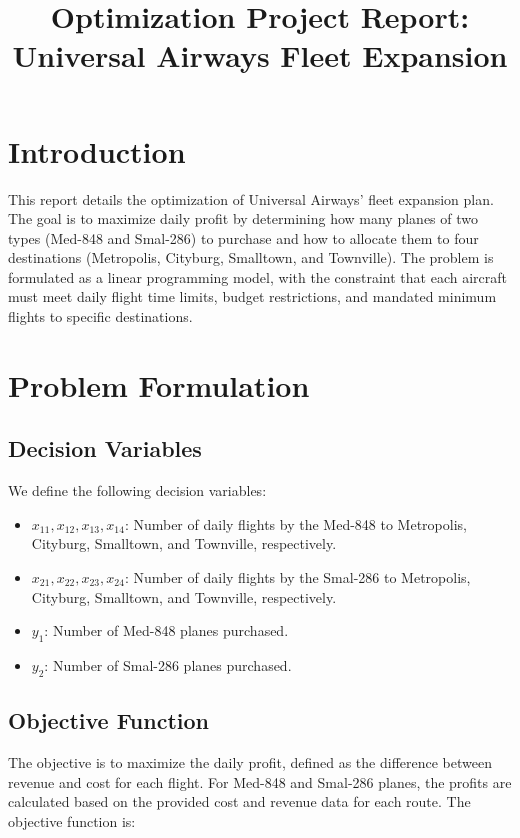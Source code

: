 \documentclass{article}
\title{Optimization Project Report: Universal Airways Fleet Expansion}
\author{}
\date{}
\begin{document}
\maketitle

\section*{Introduction}
This report details the optimization of Universal Airways' fleet expansion plan. The goal is to maximize daily profit by determining how many planes of two types (Med-848 and Smal-286) to purchase and how to allocate them to four destinations (Metropolis, Cityburg, Smalltown, and Townville). The problem is formulated as a linear programming model, with the constraint that each aircraft must meet daily flight time limits, budget restrictions, and mandated minimum flights to specific destinations.

\section*{Problem Formulation}

\subsection*{Decision Variables}
We define the following decision variables:
\begin{itemize}
    \item $x_{11}, x_{12}, x_{13}, x_{14}$: Number of daily flights by the Med-848 to Metropolis, Cityburg, Smalltown, and Townville, respectively.
    \item $x_{21}, x_{22}, x_{23}, x_{24}$: Number of daily flights by the Smal-286 to Metropolis, Cityburg, Smalltown, and Townville, respectively.
    \item $y_1$: Number of Med-848 planes purchased.
    \item $y_2$: Number of Smal-286 planes purchased.
\end{itemize}

\subsection*{Objective Function}
The objective is to maximize the daily profit, defined as the difference between revenue and cost for each flight. For Med-848 and Smal-286 planes, the profits are calculated based on the provided cost and revenue data for each route. The objective function is:
\end{document}
